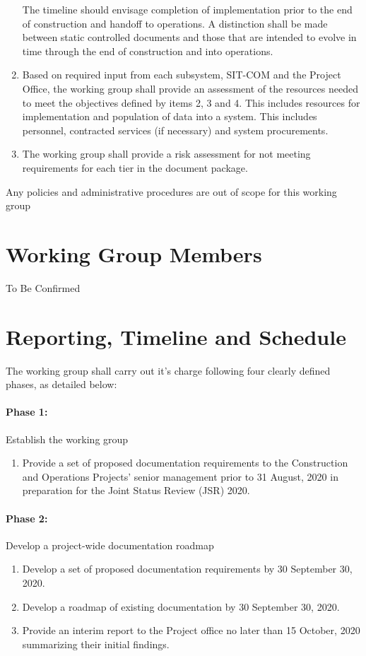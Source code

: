 \documentclass[SE,authoryear,toc]{lsstdoc}
\begin{document}
\begin{enumerate}
{The timeline should envisage completion  of implementation prior to the end of construction and handoff to operations.
A distinction shall be made between static controlled documents and those that are intended to evolve in time through the end of construction and into operations. }
\item {Based on required input from each subsystem, SIT-COM and the Project Office, the working group shall provide an assessment of the resources needed to meet the objectives defined by items 2, 3 and 4.
This includes resources for implementation and population of data into a system.
This includes personnel, contracted services (if necessary) and system procurements.}
\item{The working group shall provide a risk assessment for not meeting requirements for each tier in the document package.}
\end{enumerate}

Any policies and administrative  procedures are out of scope for this working group

\section{Working Group Members}
 
To Be Confirmed 

\section{Reporting, Timeline and Schedule}
The working group shall carry out it's charge following four clearly defined phases, as detailed below: 

\paragraph{Phase 1:} Establish the working group 
\begin{enumerate}
\item  Provide a set of proposed documentation requirements to the Construction and Operations Projects' senior management  prior to 31 August, 2020 in preparation for the Joint Status Review (JSR) 2020.  
\end{enumerate}

\paragraph{Phase 2:} Develop a project-wide documentation roadmap 	
\begin{enumerate}
\item Develop a set of proposed documentation requirements by 30 September 30, 2020. 
\item Develop a roadmap of existing documentation by 30 September 30, 2020.
\item Provide an interim report to the Project office no later than 15 October, 2020 summarizing their initial findings. 
\end{enumerate}
\end{document}

